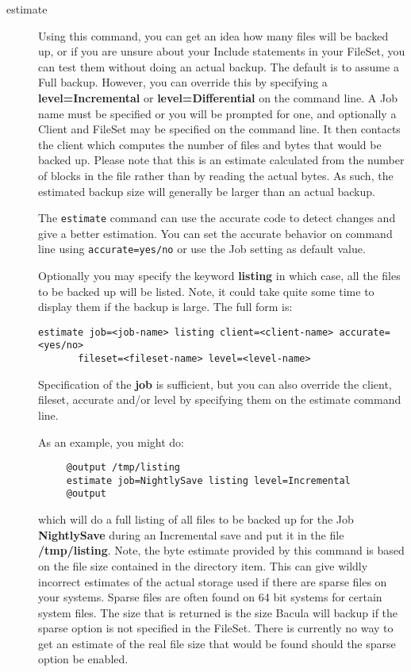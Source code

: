 \begin{description}
\label{estimate}
\item [estimate]
   Using this command, you can get an idea how many files will be backed
   up, or if you are unsure about your Include statements in your FileSet,
   you can test them without doing an actual backup.  The default is to
   assume a Full backup.  However, you can override this by specifying a
   {\bf level=Incremental} or {\bf level=Differential} on the command line.
   A Job name must be specified or you will be prompted for one, and
   optionally a Client and FileSet may be specified on the command line.
   It then contacts the client which computes the number of files and bytes
   that would be backed up.  Please note that this is an estimate
   calculated from the number of blocks in the file rather than by reading
   the actual bytes.  As such, the estimated backup size will generally be
   larger than an actual backup. 

   The \texttt{estimate} command can use the accurate code to detect changes
   and give a better estimation. You can set the accurate behavior on command
   line using \texttt{accurate=yes/no} or use the Job setting as default value.

   Optionally you may specify the keyword {\bf listing} in  which case, all the
   files to be backed up will be listed.  Note, it could take quite some time to
   display them if the  backup is large. The full form is:  

\begin{verbatim}
estimate job=<job-name> listing client=<client-name> accurate=<yes/no>
       fileset=<fileset-name> level=<level-name>  
\end{verbatim}

   Specification of the {\bf job} is sufficient, but you can also override the
   client, fileset, accurate and/or level by specifying them on the estimate
   command line.
 

As an example, you might do:  

\footnotesize
\begin{verbatim}
     @output /tmp/listing
     estimate job=NightlySave listing level=Incremental
     @output
\end{verbatim}
\normalsize

   which will do a full listing of all files to be backed up for the  Job {\bf
   NightlySave} during an Incremental save and put it in the  file {\bf
   /tmp/listing}.  Note, the byte estimate provided by this command is 
   based on the file size contained in the directory item. This can give
   wildly incorrect estimates of the actual storage used if there are
   sparse files on your systems. Sparse files are often found on 64 bit 
   systems for certain system files. The size that is returned is the size
   Bacula will backup if the sparse option is not specified in the FileSet.
   There is currently no way to get an estimate of the real file size that 
   would be found should the sparse option be enabled.
                                   

\end{description}
